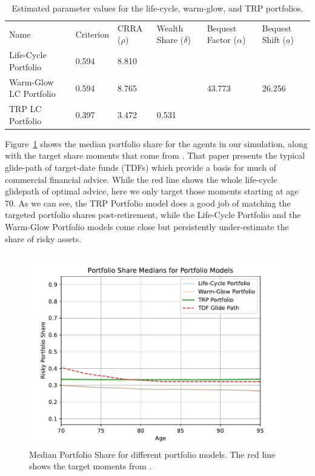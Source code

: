 \documentclass{article}
\newcommand{\CRRA}{\rho}
\begin{document}
\begin{table}
\centering
\caption[]{Estimated parameter values for the life-cycle, warm-glow, and TRP portfolios.}
\label{parameters}
\begin{tabular}{p{}p{}p{}p{}p{}p{}}
\toprule
Name & Criterion & CRRA ($\CRRA$) & Wealth Share ($\delta$) & Bequest Factor ($\alpha$) & Bequest Shift ($\underline{a}$) \\
Life-Cycle Portfolio & 0.594 & 8.810 &  &  &  \\
Warm-Glow LC Portfolio & 0.594 & 8.765 &  & 43.773 & 26.256 \\
TRP LC Portfolio & 0.397 & 3.472 & 0.531 &  &  \\
\bottomrule
\end{tabular}
\end{table}

Figure~\ref{medshare} shows the median portfolio share for the agents in our simulation, along with the target share moments that come from \cite{Aboagye2024}. That paper presents the typical glide-path of target-date funds (TDFs) which provide a basis for much of commercial financial advice. While the red line shows the whole life-cycle glidepath of optimal advice, here we only target those moments starting at age 70. As we can see, the TRP Portfolio model does a good job of matching the targeted portfolio shares post-retirement, while the Life-Cycle Portfolio and the Warm-Glow Portfolio models come close but persistently under-estimate the share of risky assets.

\begin{figure}[!htbp]
\centering
\includegraphics[width=0.7\linewidth]{files/median_share-7bc7072478f0d82411669d2df5788c72.pdf}
\caption[]{Median Portfolio Share for different portfolio models. The red line shows the target moments from \cite{Aboagye2024}.}
\label{medshare}
\end{figure}
\end{document}
